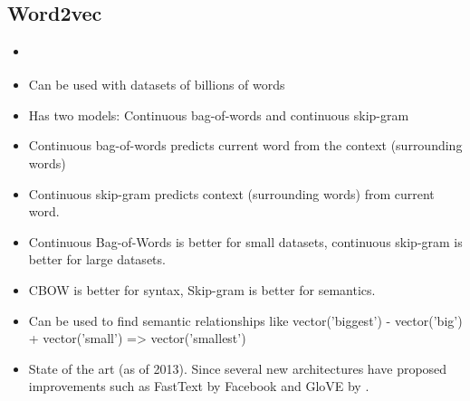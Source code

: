 \documentclass[12pt,a4paper,english
]{tutthesis}
\begin{document}
\subsection{Word2vec}
\begin{itemize}
\item \cite{Mikolov2013}
\item Can be used with datasets of billions of words
\item Has two models: Continuous bag-of-words and continuous skip-gram
\item Continuous bag-of-words predicts current word from the context (surrounding words)
\item Continuous skip-gram predicts context (surrounding words) from current word.
\item Continuous Bag-of-Words is better for small datasets, continuous skip-gram is better for large datasets.
\item CBOW is better for syntax, Skip-gram is better for semantics.
\item Can be used to find semantic relationships like vector('biggest') - vector('big') + vector('small') => vector('smallest') 
\item State of the art (as of 2013). Since several new architectures have proposed improvements such as FastText by Facebook and GloVE by \cite{Pennington2014}.
\end{itemize}
\end{document}
